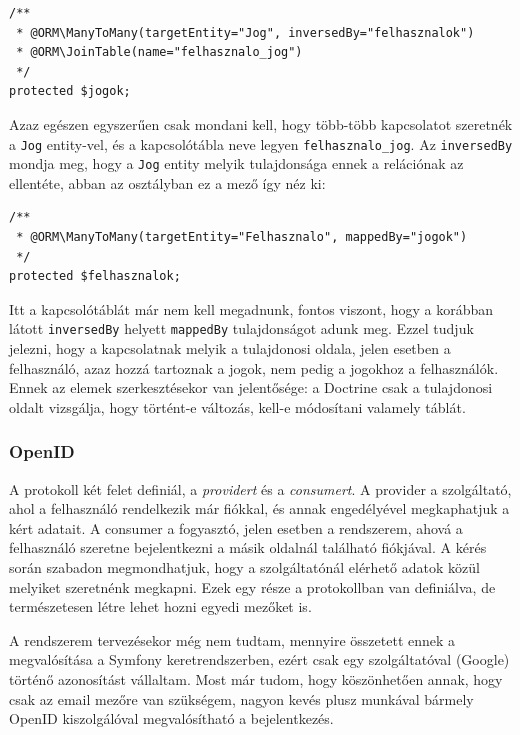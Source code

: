 \documentclass[a4paper,12pt,oneside]{report}
\begin{document}
\begin{lstlisting}
/**
 * @ORM\ManyToMany(targetEntity="Jog", inversedBy="felhasznalok")
 * @ORM\JoinTable(name="felhasznalo_jog")
 */
protected $jogok;
\end{lstlisting}

Azaz egészen egyszerűen csak mondani kell, hogy több-több kapcsolatot szeretnék a {\tt Jog} entity-vel, és a kapcsolótábla neve legyen {\tt felhasznalo\_jog}. Az {\tt inversedBy} mondja meg, hogy a {\tt Jog} entity melyik tulajdonsága ennek a relációnak az ellentéte, abban az osztályban ez a mező így néz ki:

\begin{lstlisting}
/**
 * @ORM\ManyToMany(targetEntity="Felhasznalo", mappedBy="jogok")
 */
protected $felhasznalok;
\end{lstlisting}

Itt a kapcsolótáblát már nem kell megadnunk, fontos viszont, hogy a korábban látott {\tt inversedBy} helyett {\tt mappedBy} tulajdonságot adunk meg. Ezzel tudjuk jelezni, hogy a kapcsolatnak melyik a tulajdonosi oldala, jelen esetben a felhasználó, azaz hozzá tartoznak a jogok, nem pedig a jogokhoz a felhasználók. Ennek az elemek szerkesztésekor van jelentősége: a Doctrine csak a tulajdonosi oldalt vizsgálja, hogy történt-e változás, kell-e módosítani valamely táblát.

\subsubsection*{OpenID}

A protokoll két felet definiál, a {\em providert} és a {\em consumert}. A provider a szolgáltató, ahol a felhasználó rendelkezik már fiókkal, és annak engedélyével megkaphatjuk a kért adatait. A consumer a fogyasztó, jelen esetben a rendszerem, ahová a felhasználó szeretne bejelentkezni a másik oldalnál található fiókjával. A kérés során szabadon megmondhatjuk, hogy a szolgáltatónál elérhető adatok közül melyiket szeretnénk megkapni. Ezek egy része a protokollban van definiálva, de természetesen létre lehet hozni egyedi mezőket is.

A rendszerem tervezésekor még nem tudtam, mennyire összetett ennek a megvalósítása a Symfony keretrendszerben, ezért csak egy szolgáltatóval (Google) történő azonosítást vállaltam. Most már tudom, hogy köszönhetően annak, hogy csak az email mezőre van szükségem, nagyon kevés plusz munkával bármely OpenID kiszolgálóval megvalósítható a bejelentkezés.
\end{document}
